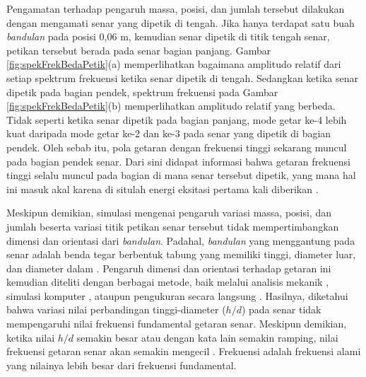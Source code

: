 Pengamatan terhadap pengaruh massa, posisi, dan jumlah \bandulan tersebut dilakukan dengan mengamati senar \bundengan yang dipetik di tengah. Jika hanya terdapat satu buah \textit{bandulan} pada posisi 0,06 m, kemudian senar dipetik di titik tengah senar, petikan tersebut berada pada senar bagian panjang. Gambar \ref{fig:spekFrekBedaPetik}(a) memperlihatkan bagaimana amplitudo relatif dari setiap spektrum frekuensi ketika senar dipetik di tengah. Sedangkan ketika senar dipetik pada bagian pendek, spektrum frekuensi pada Gambar \ref{fig:spekFrekBedaPetik}(b) memperlihatkan amplitudo relatif yang berbeda. Tidak seperti ketika senar dipetik pada bagian panjang, mode getar ke-4 lebih kuat daripada mode getar ke-2 dan ke-3 pada senar yang dipetik di bagian pendek. Oleh sebab itu, pola getaran dengan frekuensi tinggi sekarang muncul pada bagian pendek senar. Dari sini didapat informasi bahwa getaran frekuensi tinggi selalu muncul pada bagian di mana senar tersebut dipetik, yang mana hal ini masuk akal karena di situlah energi eksitasi pertama kali diberikan \cite{paperGetaranBandulan}. \par
Meskipun demikian, simulasi mengenai pengaruh variasi massa, posisi, dan jumlah \bandulan beserta variasi titik petikan senar tersebut tidak mempertimbangkan dimensi dan orientasi dari \textit{bandulan}. Padahal, \textit{bandulan} yang menggantung pada senar \bundengan adalah benda tegar berbentuk tabung yang memiliki tinggi, diameter luar, dan diameter dalam \cite{skripsiMona}. Pengaruh dimensi dan orientasi \bandulan terhadap getaran ini kemudian diteliti dengan berbagai metode, baik melalui analisis mekanik \cite{skripsiMona}, simulasi komputer \cite{skripsiAyrton}, ataupun pengukuran secara langsung \cite{skripsiJulda}. Hasilnya, diketahui bahwa variasi nilai perbandingan tinggi-diameter ($h/d$) \bandulan pada senar tidak mempengaruhi nilai frekuensi fundamental getaran senar. Meskipun demikian, ketika nilai $h/d$ semakin besar atau dengan kata lain \bandulan semakin ramping, nilai frekuensi \overtone getaran senar akan semakin mengecil \cite{prosidingDimensiBandulan}. Frekuensi \overtone adalah frekuensi alami yang nilainya lebih besar dari frekuensi fundamental. \par 

